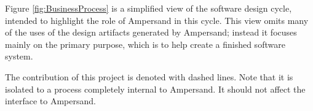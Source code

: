 \documentclass[12pt]{report}
\begin{document}
%

Figure \ref{fig:BusinessProcess} is a simplified view of the software design
cycle, intended to highlight the role of Ampersand in this cycle. This view
omits many of the uses of the design artifacts
 generated by Ampersand; instead
it focuses mainly on the primary purpose, which is to help create a finished
software system. 

The contribution of this project is denoted with dashed lines. Note that it is
isolated to a process completely internal to Ampersand. It should not affect the
interface to Ampersand.

\end{document}
